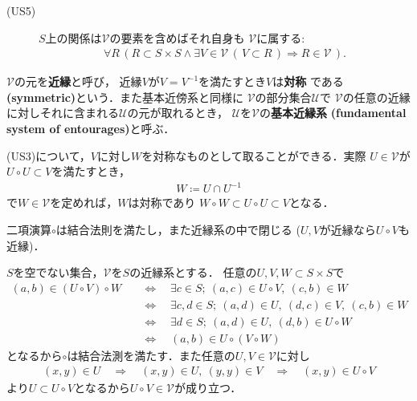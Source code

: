 \begin{screen}
\begin{dfn}[近縁系]
\begin{description}
				\item[(US5)] $S$上の関係は$\mathscr{V}$の要素を含めばそれ自身も
					$\mathscr{V}$に属する:
					\begin{align}
						\forall R\,
						\left( R \subset S \times S \wedge 
						\exists V \in \mathscr{V}\, \left(\, V \subset R\, \right)
						\Longrightarrow R \in \mathscr{V}\, \right).
					\end{align}
			\end{description}
			$\mathscr{V}$の元を{\bf 近縁}と呼び，
			近縁$V$が$V = V^{-1}$を満たすとき$V$は{\bf 対称}
			である{\bf (symmetric)}という．また基本近傍系と同様に
			$\mathscr{V}$の部分集合$\mathscr{U}$で
			$\mathscr{V}$の任意の近縁に対しそれに含まれる$\mathscr{U}$の元が取れるとき，
			$\mathscr{U}$を$\mathscr{V}$の{\bf 基本近縁系}
			{\bf (fundamental system of entourages)}と呼ぶ．
		\end{dfn}
	\end{screen}
	(US3)について，$V$に対し$W$を対称なものとして取ることができる．実際
	$U \in \mathscr{V}$が$U \circ U \subset V$を満たすとき，
	\begin{align}
		W \coloneqq U \cap U^{-1}
	\end{align}
	で$W \in \mathscr{V}$を定めれば，$W$は対称であり
	$W \circ W \subset U \circ U \subset V$となる．
	
	\begin{screen}
		\begin{thm}
		\label{thm:uniform_structure_is_a_semigroup}
			二項演算$\circ$は結合法則を満たし，また近縁系の中で閉じる
			($U,V$が近縁なら$U \circ V$も近縁)．
		\end{thm}
	\end{screen}
	
	\begin{prf}
		$S$を空でない集合，$\mathscr{V}$を$S$の近縁系とする．
		任意の$U,V,W \subset S \times S$で
		\begin{align}
			(a,b) \in (U \circ V) \circ W
			&\quad \Longleftrightarrow \quad
			\exists c \in S;\ (a,c) \in U \circ V,\ (c,b) \in W \\
			&\quad \Longleftrightarrow \quad
			\exists c,d \in S;\ (a,d) \in U,\ (d,c) \in V,\ (c,b) \in W \\
			&\quad \Longleftrightarrow \quad
			\exists d \in S;\ (a,d) \in U,\ (d,b) \in U \circ W \\
			&\quad \Longleftrightarrow \quad
			(a,b) \in U \circ (V \circ W)
		\end{align}
		となるから$\circ$は結合法測を満たす．また任意の$U,V \in \mathscr{V}$に対し
		\begin{align}
			(x,y) \in U \quad \Longrightarrow \quad
			(x,y) \in U,\ (y,y) \in V \quad \Longrightarrow \quad
			(x,y) \in U \circ V
		\end{align}
		より$U \subset U \circ V$となるから$U \circ V \in \mathscr{V}$が成り立つ．
		\QED
	\end{prf}
	
